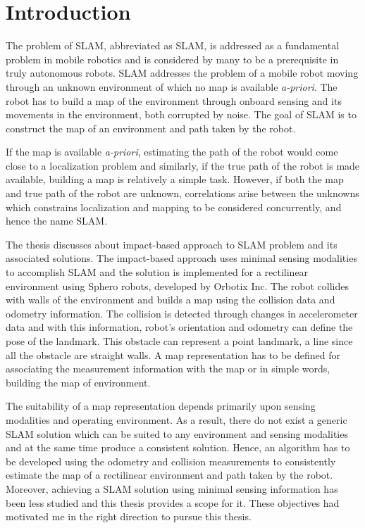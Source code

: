\chapter{Introduction} \label{chap::intro}
The problem of \acl{SLAM}, abbreviated as \acs{SLAM}, is addressed as a fundamental problem in mobile robotics and is considered by many to be a prerequisite in truly autonomous robots. SLAM addresses the problem of a mobile robot moving through an unknown environment of which no map is available {\it a-priori}. The robot has to build a map of the environment through onboard sensing and its movements in the environment, both corrupted by noise. The goal of \acs{SLAM} is to construct the map of an environment and path taken by the robot. 

If the map is available {\it a-priori}, estimating the path of the robot would come close to a localization problem and similarly, if the true path of the robot is made available, building a map is relatively a simple task.  However, if both the map and true path of the robot are unknown, correlations arise between the unknowns which constrains localization and mapping to be considered concurrently, and hence the name \acl{SLAM}.

The thesis discusses about impact-based approach to SLAM problem and its associated solutions. The impact-based approach uses minimal sensing modalities to accomplish SLAM and the solution is implemented for a rectilinear environment using Sphero robots, developed by Orbotix Inc. The robot collides with walls of the environment and builds a map using the collision data and odometry information. The collision is detected through changes in accelerometer data and with this information, robot's orientation and odometry can define the pose of the landmark.  This obstacle can represent a point landmark, a line since all the obstacle are straight walls. A map representation has to be defined for associating the measurement information with the map or in simple words, building the map of environment. 

The suitability of a map representation depends primarily upon sensing modalities and operating environment. As a result, there do not exist a generic SLAM solution which can be suited to any environment and sensing modalities and at the same time produce a consistent solution. Hence, an algorithm has to be developed using the odometry and collision measurements to consistently estimate the map of a rectilinear environment and path taken by the robot. Moreover, achieving a SLAM solution using minimal sensing information has been less studied and this thesis provides a scope for it. These objectives had motivated me in the right direction to pursue this thesis.

